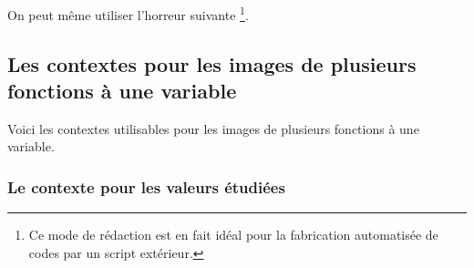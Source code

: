 \documentclass[10pt, a4paper]{article}
\begin{document}
On peut même utiliser l'horreur suivante
\footnote{
    Ce mode de rédaction est en fait idéal pour la fabrication automatisée de codes par un script extérieur.
}.




\subsection{Les contextes pour les images de plusieurs fonctions à une variable}

Voici les contextes utilisables pour les images de plusieurs fonctions à une variable.

\medskip

\begin{itemize*}[before = \leavevmode\kern15pt, itemjoin = \kern15pt]
	\item {}

	\item {}
\end{itemize*}



\subsubsection{Le contexte  pour les valeurs étudiées}
\label{tns-math-functab-dsl-l3-ctxt-xvals}
\end{document}
